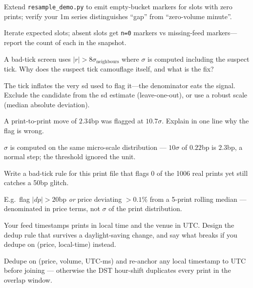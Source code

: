 \begin{exercise}[hard]
Extend \texttt{resample\_demo.py} to emit empty-bucket markers for slots with zero prints;
verify your 1m series distinguishes ``gap'' from ``zero-volume minute''.
\end{exercise}
\begin{solution}
Iterate expected slots; absent slots get \texttt{n=0} markers vs missing-feed markers---
report the count of each in the snapshot.
\end{solution}

\begin{exercise}[hard]
A bad-tick screen uses $|r|>8\sigma_{\text{neighbours}}$ where $\sigma$ is computed including
the suspect tick. Why does the suspect tick camouflage itself, and what is the fix?
\end{exercise}
\begin{solution}
The tick inflates the very sd used to flag it---the denominator eats the signal. Exclude the
candidate from the sd estimate (leave-one-out), or use a robust scale (median absolute
deviation).
\end{solution}

\begin{exercise}[easy]
A print-to-print move of $2.34$bp was flagged at $10.7\sigma$.
Explain in one line why the flag is wrong.
\end{exercise}
\begin{solution}
$\sigma$ is computed on the same micro-scale distribution ---
$10\sigma$ of $0.22$bp is $2.3$bp, a normal step; the threshold
ignored the unit.
\end{solution}
\begin{exercise}[medium]
Write a bad-tick rule for this print file that flags $0$ of the
1006 real prints yet still catches a 50bp glitch.
\end{exercise}
\begin{solution}
E.g.\ flag $|dp| > 20$bp \emph{or} price deviating $>0.1\%$ from a
5-print rolling median --- denominated in price terms, not
$\sigma$ of the print distribution.
\end{solution}
\begin{exercise}[hard]
Your feed timestamps prints in local time and the venue in UTC.
Design the dedup rule that survives a daylight-saving change, and
say what breaks if you dedupe on (price, local-time) instead.
\end{exercise}
\begin{solution}
Dedupe on (price, volume, UTC-ms) and re-anchor any local
timestamp to UTC before joining --- otherwise the DST hour-shift
duplicates every print in the overlap window.
\end{solution}

